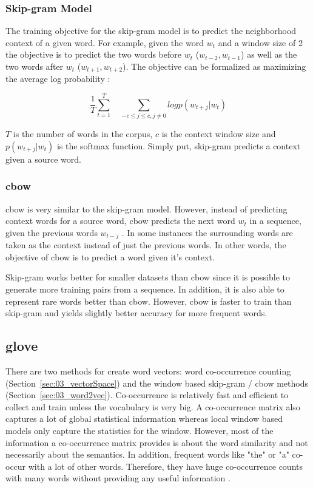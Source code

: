 \subsubsection*{Skip-gram Model}

The training objective for the skip-gram model is to predict the neighborhood context of a given word. For example, given the word $w_t$ and a window size of 2 the objective is to predict the two words before $w_t$ {($w_{t-2}, w_{t-1}$)} as well as the two words after $w_t$ {($w_{t+1}, w_{t+2}$)}. The objective can be formalized as maximizing the average log probability \cite{Mikolov2013e}:

\begin{equation}
\frac{1}{T} \sum_{t=1}^T \quad \sum_{-c\leq j \leq c, j \neq 0} log p(w_{t+j} | w_t)
\end{equation}

$T$ is the number of words in the corpus, $c$ is the context window size and $p(w_{t+j} | w_t)$ is the softmax function. Simply put, skip-gram predicts a context given a source word.

\subsubsection*{\acrfull{cbow}}

\gls{cbow} is very similar to the skip-gram model. However, instead of predicting context words for a source word, \gls{cbow} predicts the next word $w_{t}$ in a sequence, given the previous words $w_{t-j}$ \cite{Mikolov2013c}. In some instances the surrounding words are taken as the context instead of just the previous words. In other words, the objective of \gls{cbow} is to predict a word given it's context.
\medskip

Skip-gram works better for smaller datasets than \gls{cbow} since it is possible to generate more training pairs from a sequence. In addition, it is also able to represent rare words better than \gls{cbow}. However, \gls{cbow} is faster to train than skip-gram and yields slightly better accuracy for more frequent words.

\subsection{\acrfull{glove}}

There are two methods for create word vectors: word co-occurrence counting {(Section~\ref{sec:03_vectorSpace})} and the window based skip-gram / \gls{cbow} methods {(Section~\ref{sec:03_word2vec})}. Co-occurrence is relatively fast and efficient to collect and train unless the vocabulary is very big. A co-occurrence matrix also captures a lot of global statistical information whereas local window based models only capture the statistics for the window. However, most of the information a co-occurrence matrix provides is about the word similarity and not necessarily about the semantics. In addition, frequent words like "the" or "a" co-occur with a lot of other words. Therefore, they have huge co-occurrence counts with many words without providing any useful information \cite{Pennington2014a}.

